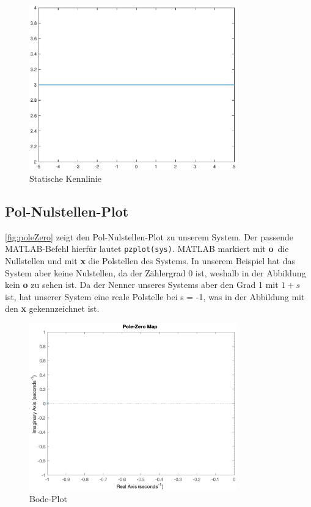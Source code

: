 \begin{figure}[H]
    \label{fig:staticCurve}
    \centering
    \includegraphics[width=0.8\textwidth]{Bilder/StaticCurvePT1Tt.eps}
    \caption{Statische Kennlinie}
 \end{figure}

\subsection{Pol-Nulstellen-Plot}
\autoref{fig:poleZero} zeigt den Pol-Nulstellen-Plot zu unserem System. Der passende MATLAB-Befehl hierfür lautet \texttt{pzplot(sys)}. MATLAB markiert mit \textbf{o} die Nullstellen und mit \textbf{x} die Polstellen des Systems. In unserem Beispiel hat das System aber keine Nulstellen, da der Zählergrad 0 ist, weshalb in der Abbildung kein \textbf{o} zu sehen ist. Da der Nenner unseres Systems aber den Grad 1 mit $1 + s$ ist, hat unserer System eine reale Polstelle bei s = -1, was in der Abbildung mit den \textbf{x} gekennzeichnet ist.

\begin{figure}[H]
    \centering
    \includegraphics[width=0.8\textwidth]{Bilder/PoleZeroPT1Tt.eps}
    \caption{Bode-Plot}
 \end{figure}
 \label{fig:poleZero}

